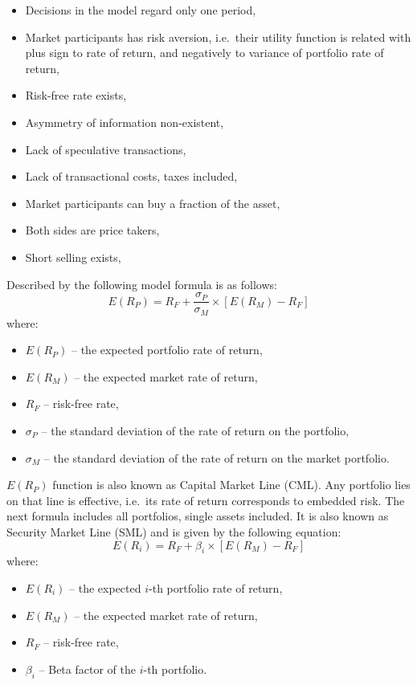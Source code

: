 \documentclass[]{article}
\providecommand{\tightlist}{%
  \setlength{\itemsep}{0pt}\setlength{\parskip}{0pt}}
\begin{document}
\begin{itemize}
\tightlist
\item
  Decisions in the model regard only one period,
\item
  Market participants has risk aversion, i.e.~their utility function is
  related with plus sign to rate of return, and negatively to variance
  of portfolio rate of return,
\item
  Risk-free rate exists,
\item
  Asymmetry of information non-existent,
\item
  Lack of speculative transactions,
\item
  Lack of transactional costs, taxes included,
\item
  Market participants can buy a fraction of the asset,
\item
  Both sides are price takers,
\item
  Short selling exists,
\end{itemize}

Described by the following model formula is as follows: \[
E(R_P)=R_F+\frac{\sigma_P}{\sigma_M}\times[E(R_M)-R_F]
\] where:

\begin{itemize}
\tightlist
\item
  \(E(R_P)\) -- the expected portfolio rate of return,
\item
  \(E(R_M)\) -- the expected market rate of return,
\item
  \(R_F\) -- risk-free rate,
\item
  \(\sigma_P\) -- the standard deviation of the rate of return on the
  portfolio,
\item
  \(\sigma_M\) -- the standard deviation of the rate of return on the
  market portfolio.
\end{itemize}

\(E(R_P)\) function is also known as Capital Market Line (CML). Any
portfolio lies on that line is effective, i.e.~its rate of return
corresponds to embedded risk. The next formula includes all portfolios,
single assets included. It is also known as Security Market Line (SML)
and is given by the following equation: \[ \label{eq:erl}
E(R_i)=R_F+\beta_i\times[E(R_M)-R_F]
\] where:

\begin{itemize}
\tightlist
\item
  \(E(R_i)\) -- the expected \(i\)-th portfolio rate of return,
\item
  \(E(R_M)\) -- the expected market rate of return,
\item
  \(R_F\) -- risk-free rate,
\item
  \(\beta_i\) -- Beta factor of the \(i\)-th portfolio.
\end{itemize}
\end{document}
